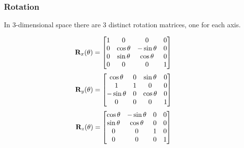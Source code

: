 \documentclass[11pt]{article}
\begin{document}
\subsubsection{Rotation}
In 3-dimensional space there are 3 distinct rotation matrices, one for each
axis.
\vspace{-0.25in}
\scriptsize
\begin{multicols}{3}
    \begin{align}
        \text{\bf R}_x(\theta) &=
        \begin{bmatrix}
            1           & 0             & 0             & 0 \\
            0           & \cos\theta    & -\sin\theta   & 0 \\
            0           & \sin\theta    & \cos\theta    & 0 \\
            0           & 0             & 0             & 1
        \end{bmatrix}
    \end{align}
    \vfill\columnbreak
    \begin{align}
        \text{\bf R}_y(\theta) &=
        \begin{bmatrix}
            \cos\theta  & 0             & \sin\theta    & 0 \\
            1           & 1             & 0             & 0 \\
            -\sin\theta & 0             & \cos\theta    & 0 \\
            0           & 0             & 0             & 1
        \end{bmatrix}
    \end{align}
    \vfill\columnbreak
    \begin{align}
        \text{\bf R}_z(\theta) &=
        \begin{bmatrix}
            \cos\theta  & -\sin\theta   & 0             & 0 \\
            \sin\theta  & \cos\theta    & 0             & 0 \\
            0           & 0             & 1             & 0 \\
            0           & 0             & 0             & 1
        \end{bmatrix}
    \end{align}
    \vspace*{\fill}
\end{multicols}
\normalsize
\vspace{-0.40in}
\end{document}
